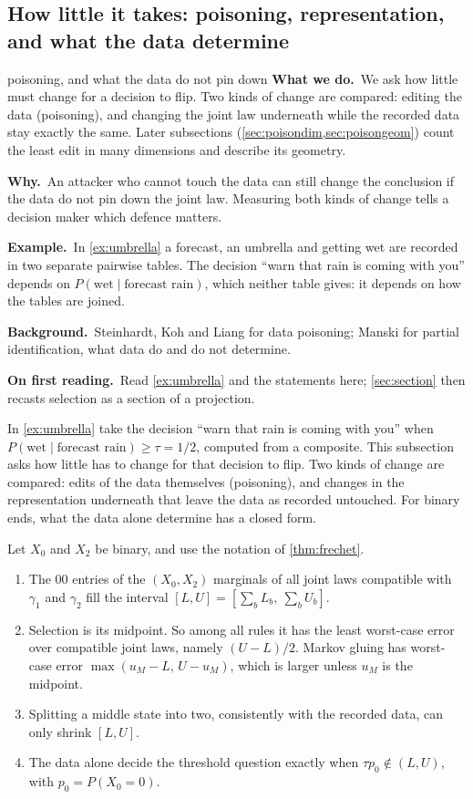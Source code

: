 \documentclass[11pt]{article}
\theoremstyle{definition}\newtheorem{definition}[theorem]{Definition}\newtheorem{remark}[theorem]{Remark}\newtheorem{example}[theorem]{Example}\newtheorem{problem}[theorem]{Open problem}\crefname{problem}{Problem}{Problems}
\newcommand{\rbwhat}{\textcolor{rbWhat}{\textbf{What we do.}}~}\newcommand{\rbwhy}{\par\smallskip\textcolor{rbWhy}{\textbf{Why.}}~}
\newcommand{\rbex}{\par\smallskip\textcolor{rbEx}{\textbf{Example.}}~}\newcommand{\rbbg}{\par\smallskip\textcolor{rbBg}{\textbf{Background.}}~}
\newcommand{\rbfirst}{\par\smallskip\textcolor{rbFirst}{\textbf{On first reading.}}~}
\begin{document}
\subsection{How little it takes: poisoning, representation, and what the data determine}\label{sec:howlittle}
\begin{readerbox}{poisoning, and what the data do not pin down}
\rbwhat We ask how little must change for a decision to flip. Two kinds of change are compared: editing the data (poisoning), and changing the joint law underneath while the recorded data stay exactly the same. Later subsections (\cref{sec:poisondim,sec:poisongeom}) count the least edit in many dimensions and describe its geometry.
\rbwhy An attacker who cannot touch the data can still change the conclusion if the data do not pin down the joint law. Measuring both kinds of change tells a decision maker which defence matters.
\rbex In \cref{ex:umbrella} a forecast, an umbrella and getting wet are recorded in two separate pairwise tables. The decision ``warn that rain is coming with you'' depends on $P(\text{wet}\mid\text{forecast rain})$, which neither table gives: it depends on how the tables are joined.
\rbbg Steinhardt, Koh and Liang \cite{SteinhardtKohLiang2017} for data poisoning; Manski \cite{Manski2003} for partial identification, what data do and do not determine.
\rbfirst Read \cref{ex:umbrella} and the statements here; \cref{sec:section} then recasts selection as a section of a projection.
\end{readerbox}
In \cref{ex:umbrella} take the decision ``warn that rain is coming with you'' when $P(\text{wet}\mid\text{forecast rain})\ge\tau=1/2$, computed from a composite. This subsection asks how little has to change
for that decision to flip. Two kinds of change are compared: edits of the data themselves (poisoning), and changes in the representation underneath that leave the data as recorded untouched. For binary ends,
what the data alone determine has a closed form.

\begin{proposition}\label{prop:identified}
Let $X_0$ and $X_2$ be binary, and use the notation of \cref{thm:frechet}.
\begin{enumerate}
\item[(1)] The $00$ entries of the $(X_0,X_2)$ marginals of all joint laws compatible with $\gamma_1$ and $\gamma_2$ fill the interval $[L,U]=[\sum_bL_b,\ \sum_bU_b]$.
\item[(2)] Selection is its midpoint. So among all rules it has the least worst-case error over compatible joint laws, namely $(U-L)/2$. Markov gluing has worst-case error $\max(u_M-L,\,U-u_M)$, which is
larger unless $u_M$ is the midpoint.
\item[(3)] Splitting a middle state into two, consistently with the recorded data, can only shrink $[L,U]$.
\item[(4)] The data alone decide the threshold question exactly when $\tau p_0\notin(L,U)$, with $p_0=P(X_0=0)$.
\end{enumerate}
\end{proposition}
\end{document}
